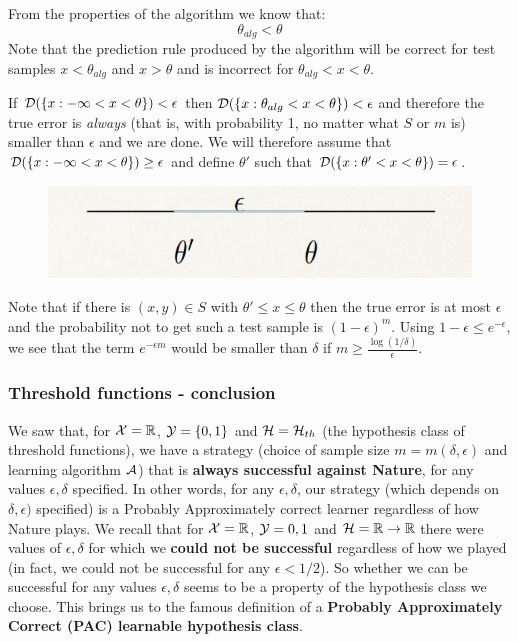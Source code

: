 {From the properties of the algorithm we know that:
$$\theta_{alg} < \theta$$
Note that the prediction rule produced by the algorithm will be correct for test samples $x<\theta_{alg}$ and $x>\theta$ and is incorrect for $\theta_{alg}<x<\theta$.

\vspace{5mm}

If $\mathcal{D}(\{x: -\infty < x < \theta\})<\epsilon$  then $\mathcal{D}(\{x: \theta_{alg} < x < \theta\})<\epsilon$  and therefore the true error is \textit{always} (that is, with probability 1, no matter what $S$ or $m$ is) smaller than $\epsilon$ and we are done. We will therefore assume that $\mathcal{D}(\{x: -\infty < x < \theta\})\geq \epsilon$  and define $\theta'$ such that $\mathcal{D}(\{x: \theta' < x < \theta\})=\epsilon$.
\begin{figure}[h!]
	\centering
	\includegraphics[scale=0.3]{chapters/pac/figures/thresholds4.png}
\end{figure}
\vspace{3mm}
Note that if there is $(x, y)\in S$ with $\theta'\leq x\leq\theta$ then the true error is at most $\epsilon$ and the probability not to get such a test sample is $(1-\epsilon)^m$.
Using  $1-\epsilon \le e^{-\epsilon}$, we see that the term $e^{-\epsilon m}$ would be smaller than $\delta$ if $m \ge  \frac{\log(1/\delta)}{\epsilon}$.


\subsubsection{Threshold functions - conclusion}

We saw that, for $\mathcal{X}=\mathbb{R}$, $\mathcal{Y}=\{0,1\}$ and $\mathcal{H}=\mathcal{H}_{th}$ (the hypothesis class of threshold functions), we have a strategy (choice of sample size $m=m(\delta,\epsilon)$ and learning algorithm $\mathcal{A}$) that is {\bf always successful against Nature}, for any values $\epsilon, \delta$ specified. In other words, for any  $\epsilon, \delta$, our strategy (which depends on $\delta,\epsilon)$ specified) is a Probably Approximately correct learner regardless of how Nature plays. 
\vspace{3mm}
We recall that for $\mathcal{X}=\mathbb{R}$, $\mathcal{Y}={0,1}$ and $\mathcal{H}=\mathbb{R}\to\mathbb{R}$ there were values of $\epsilon, \delta$ for which we {\bf could not be successful} regardless of how we played (in fact, we could not be successful for any $\epsilon<1/2$). So whether we can be successful for any values $\epsilon, \delta$ seems to be a property of the hypothesis class we choose. 
\vspace{3mm}
This brings us to the famous definition of a {\bf Probably Approximately Correct (PAC) learnable hypothesis class}.



}
